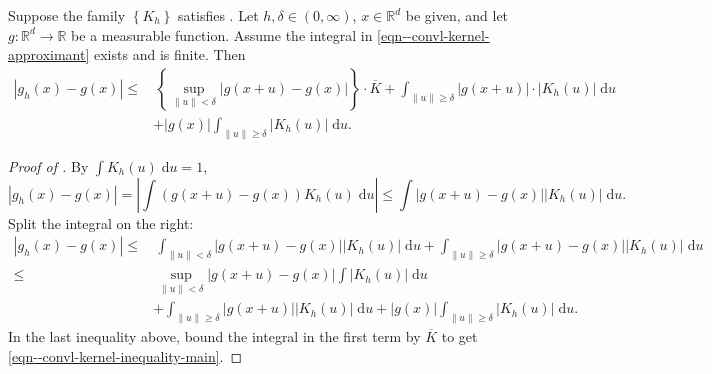 \begin{theorem}
\label{thm--convl-kernel-point-error-bound}
Suppose the family \(\left\{ K_{h} \right\}\) satisfies
.
Let \(h, \delta \in (0, \infty)\), \(x \in \mathbb{R}^{d}\) be given, and let
\(g : \mathbb{R}^{d} \to \mathbb{R}\) be a measurable function.
Assume the integral in \eqref{eqn--convl-kernel-approximant} exists and is
finite.
Then
\begin{equation}
  \begin{split}
    \left| g_{h} (x) - g (x) \right| \leq
    & \, \left\{ \sup_{\|u\| < \delta} |g (x + u) - g (x)| \right\} \cdot
    \overline{K} + \int_{\|u\| \geq \delta} |g (x + u)| \cdot \left| K_{h} (u)
    \right| \; \mathrm{d} u \\
    & + |g (x)| \int_{\|u\| \geq \delta} \left| K_{h} (u) \right| \; \mathrm{d}
    u.
  \end{split}
  \label{eqn--convl-kernel-inequality-main}
\end{equation}
\end{theorem}

\begin{proof}[Proof of ]
By \(\int K_{h} (u) \; \mathrm{d} u = 1\),
\begin{equation*}
  \left| g_{h} (x) - g (x) \right| = \left| \int (g (x + u) - g (x)) K_{h} (u)
  \; \mathrm{d} u \right| \leq \int |g (x + u) - g (x)| \left| K_{h} (u) \right|
  \; \mathrm{d} u.
\end{equation*}
Split the integral on the right:
\begin{align*}
  \left| g_{h} (x) - g (x) \right| \leq
  & \, \int_{\|u\| < \delta} |g (x + u) - g (x)| \left| K_{h} (u) \right| \;
  \mathrm{d} u %
  + \int_{\|u\| \geq \delta} |g (x + u) - g (x)| \left| K_{h} (u) \right| \;
  \mathrm{d} u \\
  \leq
  & \, \sup_{\|u\| < \delta} |g (x + u) - g (x)| \int \left| K_{h} (u) \right|
  \; \mathrm{d} u \\
  & + \int_{\|u\| \geq \delta} |g (x + u)| \left| K_{h} (u) \right| \;
  \mathrm{d} u + |g (x)| \int_{\|u\| \geq \delta} \left| K_{h} (u) \right| \;
  \mathrm{d} u.
\end{align*}
In the last inequality above, bound the integral in the first term by
\(\overline{K}\) to get \eqref{eqn--convl-kernel-inequality-main}.
\end{proof}

